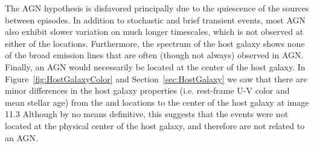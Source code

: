 The AGN hypothesis is disfavored principally due to the quiescence of
the \spock sources between episodes. In addition to stochastic and
brief transient events, most AGN also exhibit slower
variation on much longer timescales, which is not observed at either
of the \spock locations. Furthermore, the spectrum of the \spock host
galaxy shows none of the broad emission lines that are often (though
not always) observed in AGN.  Finally, an AGN would necessarily be
located at the center of the host galaxy.
In Figure~\ref{fig:HostGalaxyColor} and Section~\ref{sec:HostGalaxy}
we saw that there are minor differences in the host galaxy properties
(i.e. rest-frame U-V color and mean stellar age) from the \spockone
and \spocktwo locations to the center of the host galaxy at image 11.3
Although by no means definitive, this suggests that the \spock events
were not located at the physical center of the host galaxy, and
therefore are not related to an AGN.




